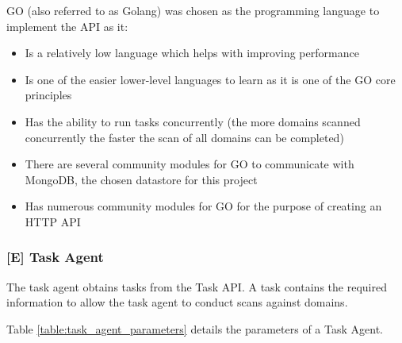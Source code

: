 \documentclass{mscreport}
\begin{document}
\vspace{0.6cm} \noindent
GO (also referred to as Golang) was chosen as the programming language to implement the API as it:
\begin{itemize}
	\setlength\itemsep{0.1em}
    \item Is a relatively low language which helps with improving performance
    \item Is one of the easier lower-level languages to learn as it is one of the GO core principles
    \item Has the ability to run tasks concurrently (the more domains scanned concurrently the faster the scan of all domains can be completed)
    \item There are several community modules for GO to communicate with MongoDB, the chosen datastore for this project
    \item Has numerous community modules for GO for the purpose of creating an HTTP API
\end{itemize}

\subsubsection{[E] Task Agent}

The task agent obtains tasks from the Task API. A task contains the required information to allow the task agent to conduct scans against domains.

\vspace{0.6cm} \noindent
Table \ref{table:task_agent_parameters} details the parameters of a Task Agent.
\newpage
\end{document}
